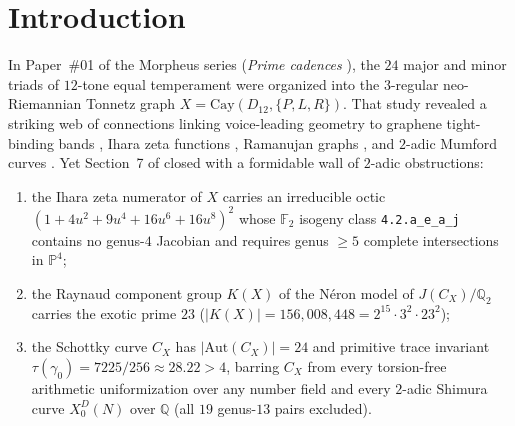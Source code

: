 \documentclass[11pt]{amsart}
\numberwithin{equation}{section}
\theoremstyle{plain}
\theoremstyle{definition}\newtheorem{definition}[theorem]{Definition}
\theoremstyle{remark}\newtheorem{remark}[theorem]{Remark}
\newcommand{\Q}{\mathbb{Q}}
\newcommand{\F}{\mathbb{F}}
\newcommand{\Aut}{\mathrm{Aut}}
\newcommand{\Cay}{\mathrm{Cay}}
\begin{document}
\begin{abstract}
$w_4=(t_yb)(t_xa)(bt_y)(t_xa)/4=5+6i-2j+4k$ ($S_W=\tfrac49$), universal all-lengths $T_4$ freeness, exact $32$ surjections yielding universal congruence quotient $K_{4,4}$ (strict non-congruence cyclic $C_3$-cover index $3$), and $0/19$ $3$-adic Borel Shimura realizations via Manin $T_3$ (\texttt{NEG-M20}). All theorems are verified across pure Python ($15/15$ gates), zero-Mathlib Lean~4.36.0 ($37/37$ theorems incl.\ exact $23\times 23$ unimodular SNF certificates, $0$ \texttt{sorry}), and zero-crate Rust ($11/11$ tests, $10/10$ suites).
\end{abstract}
\maketitle

\section{Introduction}\label{sec:intro}
In Paper~\#01 of the Morpheus series (\emph{Prime cadences} \cite{ergentics2026pc}), the $24$ major and minor triads of $12$-tone equal temperament were organized into the $3$-regular neo-Riemannian Tonnetz graph $X=\Cay(D_{12},\{P,L,R\})$. That study revealed a striking web of connections linking voice-leading geometry to graphene tight-binding bands \cite{wallace1947}, Ihara zeta functions \cite{ihara1966,sunada1986,bass1992}, Ramanujan graphs \cite{lps1988}, and $2$-adic Mumford curves \cite{mumford1972,gvdp1980}. Yet Section~7 of \cite{ergentics2026pc} closed with a formidable wall of $2$-adic obstructions:
\begin{enumerate}[label=(\roman*),nosep]
\item the Ihara zeta numerator of $X$ carries an irreducible octic $(1+4u^2+9u^4+16u^6+16u^8)^2$ whose $\F_2$ isogeny class \texttt{4.2.a\_e\_a\_j} contains no genus-$4$ Jacobian and requires genus $\ge 5$ complete intersections in $\mathbb{P}^4$;
\item the Raynaud component group $K(X)$ of the N\'eron model of $J(C_X)/\Q_2$ carries the exotic prime $23$ ($|K(X)|=156{,}008{,}448=2^{15}\cdot 3^2\cdot 23^2$);
\item the Schottky curve $C_X$ has $|\Aut(C_X)|=24$ and primitive trace invariant $\tau(\gamma_0)=7225/256\approx 28.22>4$, barring $C_X$ from every torsion-free arithmetic uniformization over any number field and every $2$-adic Shimura curve $X_0^D(N)$ over $\Q$ (all $19$ genus-$13$ pairs excluded).
\end{enumerate}
\end{document}
